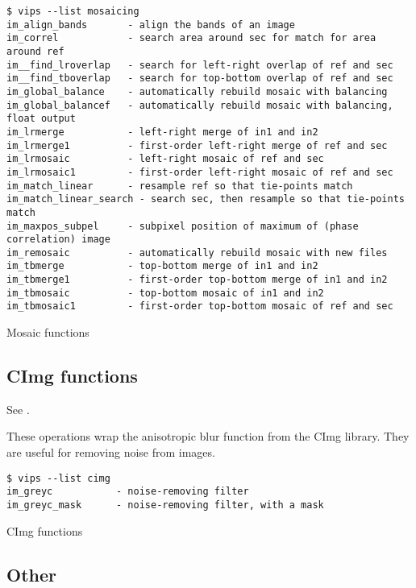 \begin{fig2}
\begin{verbatim}
$ vips --list mosaicing
im_align_bands       - align the bands of an image
im_correl            - search area around sec for match for area around ref
im__find_lroverlap   - search for left-right overlap of ref and sec
im__find_tboverlap   - search for top-bottom overlap of ref and sec
im_global_balance    - automatically rebuild mosaic with balancing
im_global_balancef   - automatically rebuild mosaic with balancing, float output
im_lrmerge           - left-right merge of in1 and in2
im_lrmerge1          - first-order left-right merge of ref and sec
im_lrmosaic          - left-right mosaic of ref and sec
im_lrmosaic1         - first-order left-right mosaic of ref and sec
im_match_linear      - resample ref so that tie-points match
im_match_linear_search - search sec, then resample so that tie-points match
im_maxpos_subpel     - subpixel position of maximum of (phase correlation) image
im_remosaic          - automatically rebuild mosaic with new files
im_tbmerge           - top-bottom merge of in1 and in2
im_tbmerge1          - first-order top-bottom merge of in1 and in2
im_tbmosaic          - top-bottom mosaic of in1 and in2
im_tbmosaic1         - first-order top-bottom mosaic of ref and sec
\end{verbatim}
\caption{Mosaic functions}
\label{fg:mosaicing}
\end{fig2}

\subsection{CImg functions}

See .

These operations wrap the anisotropic blur function from the CImg library.
They are useful for removing noise from images.

\begin{fig2}
\begin{verbatim}
$ vips --list cimg
im_greyc           - noise-removing filter
im_greyc_mask      - noise-removing filter, with a mask
\end{verbatim}
\caption{CImg functions}
\label{fg:cimg}
\end{fig2}

\subsection{Other}

